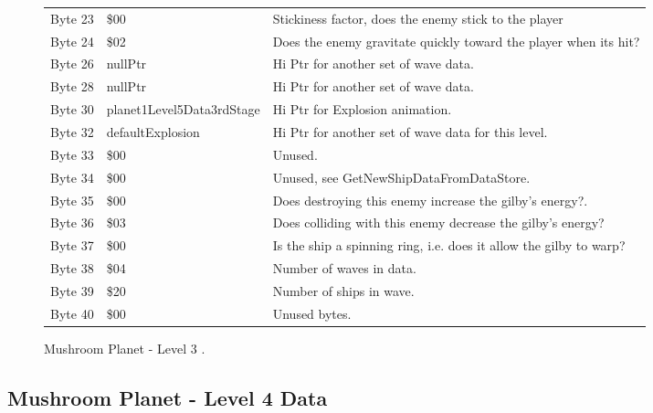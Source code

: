 \begin{figure}[H]
{\begin{adjustbox}{width=12cm}
\begin{tabular}{lll}
 Byte 23 & \$00                       & Stickiness factor, does the enemy stick to the player              \\
 Byte 24 & \$02                       & Does the enemy gravitate quickly toward the player when its hit?   \\
 Byte 26 & nullPtr                   & Hi Ptr for another set of wave data.                               \\
 Byte 28 & nullPtr                   & Hi Ptr for another set of wave data.                               \\
 Byte 30 & planet1Level5Data3rdStage & Hi Ptr for Explosion animation.                                    \\
 Byte 32 & defaultExplosion          & Hi Ptr for another set of wave data for this level.                \\
 Byte 33 & \$00                       & Unused.                                                            \\
 Byte 34 & \$00                       & Unused, see GetNewShipDataFromDataStore.                           \\
 Byte 35 & \$00                       & Does destroying this enemy increase the gilby's energy?.           \\
 Byte 36 & \$03                       & Does colliding with this enemy decrease the gilby's energy?        \\
 Byte 37 & \$00                       & Is the ship a spinning ring, i.e. does it allow the gilby to warp? \\
 Byte 38 & \$04                       & Number of waves in data.                                           \\
 Byte 39 & \$20                       & Number of ships in wave.                                           \\
 Byte 40 & \$00                       & Unused bytes.                                                      \\
\bottomrule
\end{tabular}

  \end{adjustbox}

  }\caption*{Mushroom Planet - Level 3
.}
\end{figure}

\clearpage
\subsection{Mushroom Planet - Level 4 Data}

